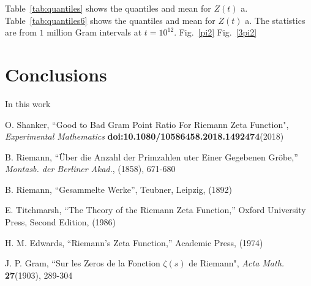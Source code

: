 \documentclass[twoside]{article}
\theoremstyle{definition}
\begin{document}
Table~\ref{tab:quantiles} shows the quantiles and mean for  $Z(t)$ a.  Table~\ref{tab:quantiles6} shows the quantiles and mean for  $Z(t)$ a. The statistics are from $1$ million Gram intervals at $t=10^{12}$. Fig.~\ref{pi2} Fig.~\ref{3pi2}
\section{\label{conclusions}Conclusions}

In this work 
\begin{thebibliography} {}

 O. Shanker, 
``Good to Bad Gram Point Ratio For Riemann Zeta Function",
{\it Experimental Mathematics} {\bf doi:10.1080/10586458.2018.1492474}(2018)



 B. Riemann, ``\"{U}ber die Anzahl der Primzahlen uter
Einer Gegebenen Gr\"{o}be,'' {\it Montasb. der Berliner Akad.}, (1858),
671-680

 B. Riemann, ``Gesammelte Werke'', Teubner, Leipzig, (1892)

 E. Titchmarsh, ``The Theory of the Riemann Zeta
Function,'' Oxford University Press, Second Edition, (1986)

 H. M. Edwards, ``Riemann's Zeta Function,''
Academic Press,  (1974)

 J. P. Gram, 
``Sur les Zeros de la Fonction  $\zeta ( s )$  de Riemann",
{\it Acta Math.} {\bf27}(1903), 289-304


\end{thebibliography} 
\end{document}
